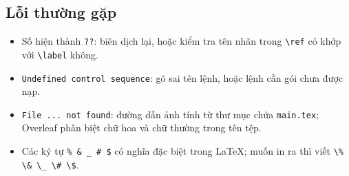 \subsection{Lỗi thường gặp}
\begin{itemize}
    \item Số hiện thành \texttt{??}: biên dịch lại, hoặc kiểm tra tên nhãn trong \verb|\ref| có khớp với \verb|\label| không.
    \item \texttt{Undefined control sequence}: gõ sai tên lệnh, hoặc lệnh cần gói chưa được nạp.
    \item \texttt{File ... not found}: đường dẫn ảnh tính từ thư mục chứa \texttt{main.tex}; Overleaf phân biệt chữ hoa và chữ thường trong tên tệp.
    \item Các ký tự \verb|% & _ # $| có nghĩa đặc biệt trong LaTeX; muốn in ra thì viết \verb|\% \& \_ \# \$|.
\end{itemize}

\clearpage
